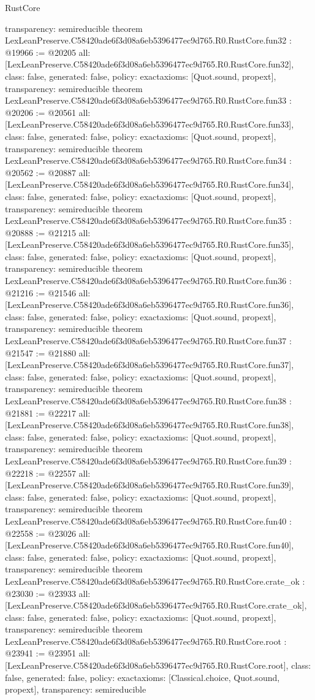 \begin{lexlean}{RustCore}
\begin{coremodule}
{  transparency: semireducible
}
theorem LexLeanPreserve.C58420ade6f3d08a6eb5396477ec9d765.R0.RustCore.fun32 : @19966 := @20205 {
  all: [LexLeanPreserve.C58420ade6f3d08a6eb5396477ec9d765.R0.RustCore.fun32],
  class: false,
  generated: false,
  policy: exact{axioms: [Quot.sound, propext]},
  transparency: semireducible
}
theorem LexLeanPreserve.C58420ade6f3d08a6eb5396477ec9d765.R0.RustCore.fun33 : @20206 := @20561 {
  all: [LexLeanPreserve.C58420ade6f3d08a6eb5396477ec9d765.R0.RustCore.fun33],
  class: false,
  generated: false,
  policy: exact{axioms: [Quot.sound, propext]},
  transparency: semireducible
}
theorem LexLeanPreserve.C58420ade6f3d08a6eb5396477ec9d765.R0.RustCore.fun34 : @20562 := @20887 {
  all: [LexLeanPreserve.C58420ade6f3d08a6eb5396477ec9d765.R0.RustCore.fun34],
  class: false,
  generated: false,
  policy: exact{axioms: [Quot.sound, propext]},
  transparency: semireducible
}
theorem LexLeanPreserve.C58420ade6f3d08a6eb5396477ec9d765.R0.RustCore.fun35 : @20888 := @21215 {
  all: [LexLeanPreserve.C58420ade6f3d08a6eb5396477ec9d765.R0.RustCore.fun35],
  class: false,
  generated: false,
  policy: exact{axioms: [Quot.sound, propext]},
  transparency: semireducible
}
theorem LexLeanPreserve.C58420ade6f3d08a6eb5396477ec9d765.R0.RustCore.fun36 : @21216 := @21546 {
  all: [LexLeanPreserve.C58420ade6f3d08a6eb5396477ec9d765.R0.RustCore.fun36],
  class: false,
  generated: false,
  policy: exact{axioms: [Quot.sound, propext]},
  transparency: semireducible
}
theorem LexLeanPreserve.C58420ade6f3d08a6eb5396477ec9d765.R0.RustCore.fun37 : @21547 := @21880 {
  all: [LexLeanPreserve.C58420ade6f3d08a6eb5396477ec9d765.R0.RustCore.fun37],
  class: false,
  generated: false,
  policy: exact{axioms: [Quot.sound, propext]},
  transparency: semireducible
}
theorem LexLeanPreserve.C58420ade6f3d08a6eb5396477ec9d765.R0.RustCore.fun38 : @21881 := @22217 {
  all: [LexLeanPreserve.C58420ade6f3d08a6eb5396477ec9d765.R0.RustCore.fun38],
  class: false,
  generated: false,
  policy: exact{axioms: [Quot.sound, propext]},
  transparency: semireducible
}
theorem LexLeanPreserve.C58420ade6f3d08a6eb5396477ec9d765.R0.RustCore.fun39 : @22218 := @22557 {
  all: [LexLeanPreserve.C58420ade6f3d08a6eb5396477ec9d765.R0.RustCore.fun39],
  class: false,
  generated: false,
  policy: exact{axioms: [Quot.sound, propext]},
  transparency: semireducible
}
theorem LexLeanPreserve.C58420ade6f3d08a6eb5396477ec9d765.R0.RustCore.fun40 : @22558 := @23026 {
  all: [LexLeanPreserve.C58420ade6f3d08a6eb5396477ec9d765.R0.RustCore.fun40],
  class: false,
  generated: false,
  policy: exact{axioms: [Quot.sound, propext]},
  transparency: semireducible
}
theorem LexLeanPreserve.C58420ade6f3d08a6eb5396477ec9d765.R0.RustCore.crate_ok : @23030 := @23933 {
  all: [LexLeanPreserve.C58420ade6f3d08a6eb5396477ec9d765.R0.RustCore.crate_ok],
  class: false,
  generated: false,
  policy: exact{axioms: [Quot.sound, propext]},
  transparency: semireducible
}
theorem LexLeanPreserve.C58420ade6f3d08a6eb5396477ec9d765.R0.RustCore.root : @23941 := @23951 {
  all: [LexLeanPreserve.C58420ade6f3d08a6eb5396477ec9d765.R0.RustCore.root],
  class: false,
  generated: false,
  policy: exact{axioms: [Classical.choice, Quot.sound, propext]},
  transparency: semireducible
}


\end{coremodule}
\end{lexlean}
